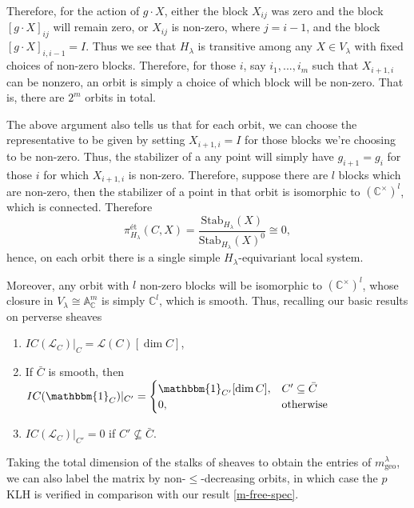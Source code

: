 \documentclass{memoir}
\newcommand{\mc}{\mathcal}
\newcommand{\ba}{\mathbb{A}}
\newcommand{\bc}{\mathbb{C}}
\newcommand{\tx}{\text}
\theoremstyle{definition}
\begin{document}
	Therefore, for the action of $g\cdot X$, either the block $X_{ij}$ was zero and the block $[g\cdot X]_{ij}$ will remain zero, or $X_{ij}$ is non-zero, where $j=i-1$, and the block $[g\cdot X]_{i, i-1}=I$. 
	Thus we see that $H_\lambda$ is transitive among any $X\in V_\lambda$ with fixed choices of non-zero blocks.  
	Therefore, for those $i$, say $i_1, ..., i_m$ such that $X_{i+1,i}$ can be nonzero, an orbit is simply a choice of which block will be non-zero.  
	That is, there are $2^m$ orbits in total.  
	
	The above argument also tells us that for each orbit, we can choose the representative to be given by setting $X_{i+1,i}=I$ for those blocks we're choosing to be non-zero.  
	Thus, the stabilizer of a any point will simply have $g_{i+1}=g_i$ for those $i$ for which $X_{i+1,i}$ is non-zero.  
	Therefore, suppose there are $l$ blocks which are non-zero, then the stabilizer of a point in that orbit is isomorphic to $(\bc^\times)^l$, which is connected.  
	Therefore 
	$$\pi_{H_\lambda}^{\tx{\'et}}(C, X)=\frac{\tx{Stab}_{H_\lambda}(X)}{\tx{Stab}_{H_\lambda}(X)^0}\cong 0,$$
	hence, on each orbit there is a single simple $H_\lambda$-equivariant local system.  
	
	Moreover, any orbit with $l$ non-zero blocks will be isomorphic to $(\bc^\times)^l$, whose closure in $V_\lambda\cong \ba_\bc^m$ is simply $\bc^l$, which is smooth.  
	Thus, recalling our basic results on perverse sheaves
	\begin{enumerate}
		\item $IC(\mc{L}_C)|_C=\mc{L}(C)[\dim C]$,
		\item If $\bar{C}$ is smooth, then $IC(\mathbbm{1}_C)|_{C'}=\begin{cases}
			\mathbbm{1}_{C'}[\dim C], & C'\subseteq \bar{C}\\
			0, & \tx{otherwise}
		\end{cases}$
		\item $IC(\mc{L}_C)|_{C'}=0$ if $C'\not\subseteq \bar{C}$. 
	\end{enumerate}  
	
	Taking the total dimension of the stalks of sheaves to obtain the entries of $m_{\tx{geo}}^\lambda$, we can also label the matrix by non-$\leq$-decreasing orbits, in which case the $p$KLH is verified in comparison with our result \ref{m-free-spec}. 
	






	
	
\end{document}
